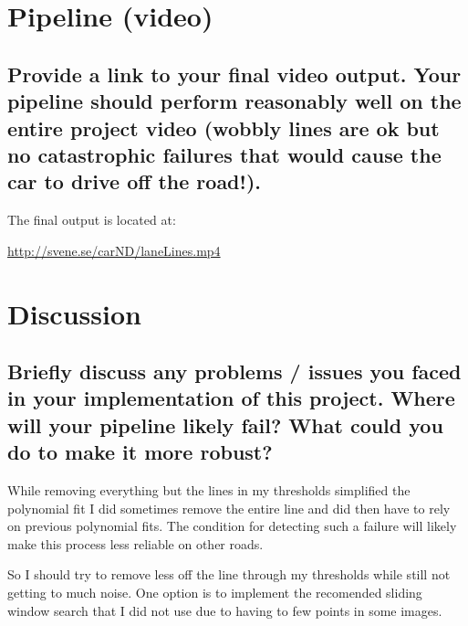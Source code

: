 \documentclass[12pt,a4paper]{article}
\begin{document}
\section{Pipeline (video)}

\subsection{Provide a link to your final video output.  Your pipeline should perform reasonably well on the entire project video (wobbly lines are ok but no catastrophic failures that would cause the car to drive off the road!).}
The final output is located at:

\url{http://svene.se/carND/laneLines.mp4}

\section{Discussion}
\subsection{Briefly discuss any problems / issues you faced in your implementation of this project.  Where will your pipeline likely fail?  What could you do to make it more robust?}
While removing everything but the lines in my thresholds simplified the polynomial fit I did sometimes remove the entire line and did then have to rely on previous polynomial fits. The condition for detecting such a failure will likely make this process less reliable on other roads.

So I should try to remove less off the line through my thresholds while still not getting to much noise. One option is to implement the recomended sliding window search that I did not use due to having to few points in some images.
\end{document}
